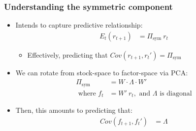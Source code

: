 \documentclass[10pt]{beamer}
\begin{document}
\begin{frame}[label=understanding_sym]
    \frametitle{Understanding the symmetric component}

\begin{itemize}
    \item Intends to capture predictive relationship:
    \begin{align*}
        E_t(r_{t+1}) & = \Pi_\text{sym} ~ r_t
    \end{align*}
    \begin{itemize}
        \item Effectively, predicting that $Cov(r_{t+1}, r_t') = \Pi_\text{sym}$
    \end{itemize}

    \vspace{10pt}
    \item We can rotate from stock-space to factor-space via PCA:
    \begin{align*}
        \Pi_\text{sym} & = W \cdot \Lambda \cdot W' \\
        \text{ where } f_t & = W'~r_t, \text{ and } \Lambda \text{ is diagonal}
    \end{align*} 

    \vspace{10pt}
    \item Then, this amounts to predicting that:
    \begin{align*}
        Cov(f_{t+1}, f_t') & = \Lambda
    \end{align*}
\end{itemize}
~\hfill \hyperlink{decomposition}{}
\end{frame}
\end{document}
